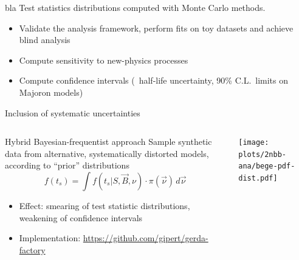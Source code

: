 \documentclass[10pt,aspectratio=169]{beamer}
\begin{document}
\begin{frame}{bla}
  Test statistics distributions computed with Monte Carlo methods.
  \begin{itemize}
    \item Validate the analysis framework, perform fits on toy datasets and achieve blind analysis
    \item Compute sensitivity to new-physics processes
    \item Compute confidence intervals (\nnbb\ half-life uncertainty, 90\% C.L.~limits on Majoron models)
  \end{itemize}
\end{frame}
\begin{frame}{Inclusion of systematic uncertainties}
  \begin{columns}
    \begin{column}{0.55\textwidth}
      \begin{alertblock}{Hybrid Bayesian-frequentist approach}
        Sample synthetic data from alternative, systematically distorted models,
        according to ``prior'' distributions
        \[
          f(t_s) = \int f(t_s | S, \vec{B}, \nu) \cdot \pi(\vec{\nu}) \, d\vec{\nu}
        \]
      \end{alertblock}
      \begin{itemize}
        \item \alert{Effect:} smearing of test statistic distributions, weakening of confidence intervals
        \item Implementation: \url{https://github.com/gipert/gerda-factory}
      \end{itemize}
    \end{column}
    \begin{column}{0.45\textwidth}
      \begin{center}
        \texttt{[image: plots/2nbb-ana/bege-pdf-dist.pdf]}
      \end{center}
    \end{column}
  \end{columns}
\end{frame}
\end{document}
